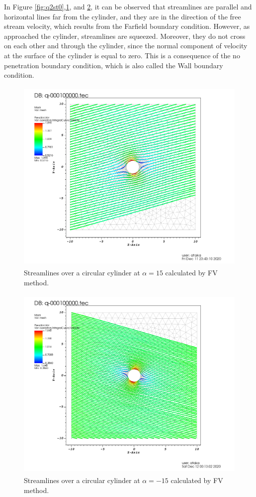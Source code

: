 \documentclass[letterpaper,12pt]{article}
\begin{document}
\vspace{1cm}

In Figure \ref{fig:q2st0},\ref{fig:q2st15}, and \ref{fig:q2st-15}, it can be observed that streamlines
are parallel and horizontal lines far from the cylinder, and they are in the direction of the free stream velocity,
which results from the Farfield boundary condition. However, as approached the cylinder, streamlines are squeezed.
Moreover, they do not cross on each other and through the cylinder, since the normal component of velocity at
the surface of the cylinder is equal to zero. This is a consequence of the no penetration boundary condition, which
is also called the Wall boundary condition.

\newpage

\begin{figure} [!h]
	\centering
	\includegraphics[height = 9.5cm]{graph/15deg/Cylinder_15angle_streamline0000.png}
	\caption{Streamlines over a circular cylinder at $\alpha=15$ calculated by FV method.}
    \label{fig:q2st15}
\end{figure}

\begin{figure} [!h]
	\centering
	\includegraphics[height = 9.5cm]{graph/neg15deg/Cylinder_neg15angle_streamline0000.png}
	\caption{Streamlines over a circular cylinder at $\alpha=-15$ calculated by FV method.}
    \label{fig:q2st-15}
\end{figure}
\end{document}
